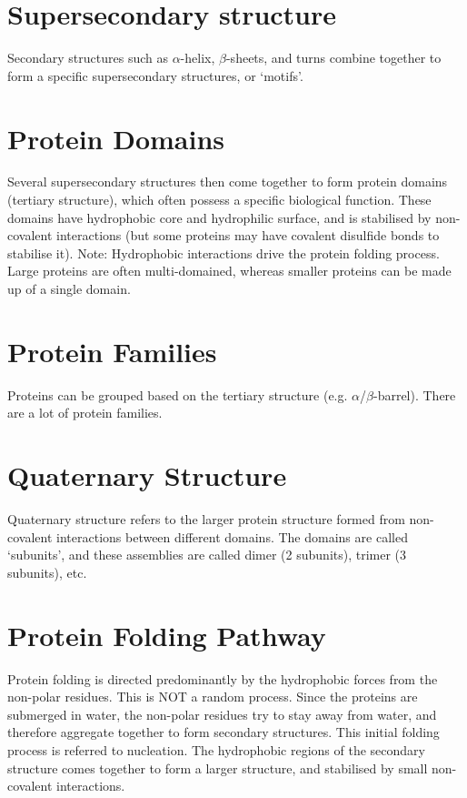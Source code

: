\section{Supersecondary structure}

Secondary structures such as $\alpha$-helix, $\beta$-sheets, and turns combine together to form a specific supersecondary structures, or `motifs'.

\begin{center}
\end{center}

\section{Protein Domains}

Several supersecondary structures then come together to form protein domains (tertiary structure), which often possess a specific biological function.
These domains have hydrophobic core and hydrophilic surface, and is stabilised by non-covalent interactions (but some proteins may have covalent disulfide bonds to stabilise it).
Note: Hydrophobic interactions drive the protein folding process.
Large proteins are often multi-domained, whereas smaller proteins can be made up of a single domain.

\section{Protein Families}

Proteins can be grouped based on the tertiary structure (e.g. $\alpha$/$\beta$-barrel).
There are a lot of protein families.

\section{Quaternary Structure}

Quaternary structure refers to the larger protein structure formed from non-covalent interactions between different domains.
The domains are called `subunits', and these assemblies are called dimer (2 subunits), trimer (3 subunits), etc.

\section{Protein Folding Pathway}

Protein folding is directed predominantly by the hydrophobic forces from the non-polar residues.
This is NOT a random process.
Since the proteins are submerged in water, the non-polar residues try to stay away from water, and therefore aggregate together to form secondary structures.
This initial folding process is referred to nucleation.
The hydrophobic regions of the secondary structure comes together to form a larger structure, and stabilised by small non-covalent interactions.

